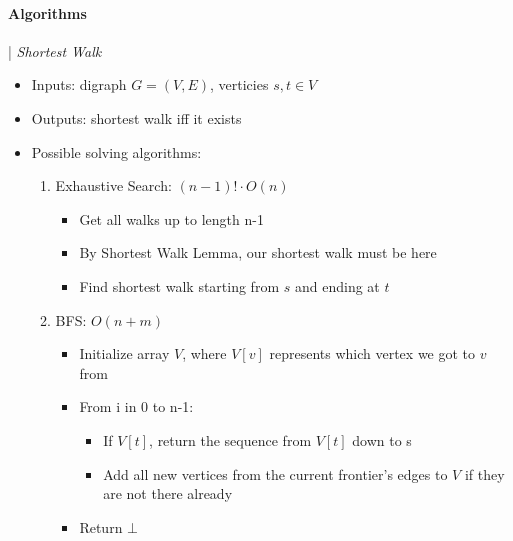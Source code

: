 \documentclass{article}
\begin{document}
\paragraph*{Algorithms} |
\newline
\newline
\emph{Shortest Walk}
\begin{itemize}
  \item Inputs: digraph $G = (V,E)$, verticies $s,t \in V$ 
  \item Outputs: shortest walk iff it exists
  \item Possible solving algorithms:
  \begin{enumerate}
    \item Exhaustive Search: $(n-1)! \cdot O(n)$
    \begin{itemize}
      \item Get all walks up to length n-1
      \item By Shortest Walk Lemma, our shortest walk must be here
      \item Find shortest walk starting from $s$ and ending at $t$
    \end{itemize}
    \item BFS: $O(n + m)$
    \begin{itemize}
      \item Initialize array $V$, where $V[v]$ represents which vertex we got to $v$ from
      \item From i in 0 to n-1:
      \begin{itemize}
        \item If $V[t]$, return the sequence from $V[t]$ down to s
        \item Add all new vertices from the current frontier's edges to $V$ if they are not there already
      \end{itemize}
      \item Return $\bot$
    \end{itemize}
  \end{enumerate}
\end{itemize}
\end{document}
